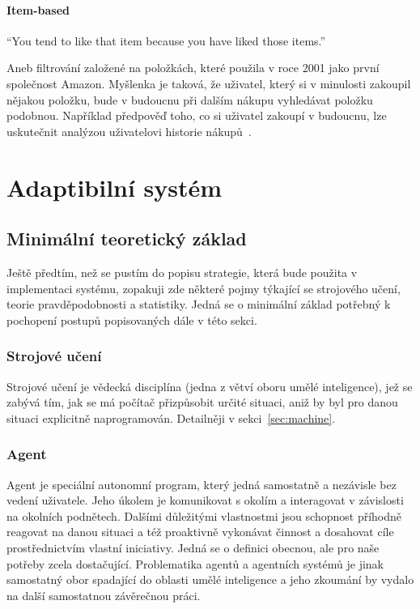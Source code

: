 \documentclass[thesis=M,czech]{FITthesis}[2014/05/07]
\begin{document}
\subsubsection{Item-based}

``You tend to like that item because you have liked those items.''~\cite{cf}

Aneb filtrování založené na položkách, které použila v roce 2001 jako první společnost Amazon. Myšlenka je taková, že uživatel, který si v minulosti zakoupil nějakou položku, bude v budoucnu při dalším nákupu vyhledávat položku podobnou. Například předpověď toho, co si uživatel zakoupí v budoucnu, lze uskutečnit analýzou uživatelovi historie nákupů~\cite{itemcf}. 

\chapter{Adaptibilní systém}
\label{chap:adapt}

\section{Minimální teoretický základ}

Ještě předtím, než se pustím do popisu strategie, která bude použita v implementaci systému, zopakuji zde některé pojmy týkající se strojového učení, teorie pravděpodobnosti a statistiky. Jedná se o minimální základ potřebný k pochopení postupů popisovaných dále v této sekci. 

\subsection{Strojové učení}
Strojové učení je vědecká disciplína (jedna z větví oboru umělé inteligence), jež se zabývá tím, jak se má počítač přizpůsobit určité situaci, aniž by byl pro danou situaci explicitně naprogramován. Detailněji v sekci~\ref{sec:machine}.

\subsection{Agent}
Agent je speciální autonomní program, který jedná samostatně a nezávisle bez vedení uživatele. Jeho úkolem je komunikovat s okolím a interagovat v závislosti na okolních podnětech. Dalšími důležitými vlastnostmi jsou schopnost příhodně reagovat na danou situaci a též proaktivně vykonávat činnost a dosahovat cíle prostřednictvím vlastní iniciativy. Jedná se o definici obecnou, ale pro naše potřeby zcela dostačující. Problematika agentů a agentních systémů je jinak samostatný obor spadající do oblasti umělé inteligence a jeho zkoumání by vydalo na další samostatnou závěrečnou práci. 
\end{document}
